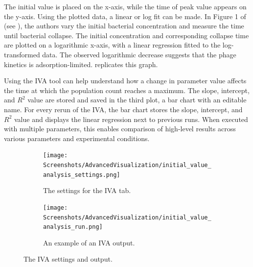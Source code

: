 The initial value is placed on the x-axis, while the time of peak value appears on the y-axis. 
Using the plotted data, a linear or log fit can be made.
In Figure 1 of \citet{mullaExtremeDiversityPhage2024} (see ), the authors vary the initial bacterial concentration and measure the time until bacterial collapse. 
The initial concentration and corresponding collapse time are plotted on a logarithmic x-axis, with a linear regression fitted to the log-transformed data.
The observed logarithmic decrease suggests that the phage kinetics is adsorption-limited. 
 replicates this graph. 

Using the IVA tool can help understand how a change in parameter value affects the time at which the population count reaches a maximum.
The slope, intercept, and $R^2$ value are stored and saved in the third plot, a bar chart with an editable name. 
For every rerun of the IVA, the bar chart stores the slope, intercept, and $R^2$ value and displays the linear regression next to previous runs. 
When executed with multiple parameters, this enables comparison of high-level results across various parameters and experimental conditions.

\begin{figure}[h!]
    \centering
    \begin{subfigure}{0.49\linewidth}
        \centering
        \captionsetup{width=1\linewidth}
        \texttt{[image: Screenshots/AdvancedVisualization/initial\_value\_analysis\_settings.png]}
        \caption{
            The settings for the IVA tab. 
        }
        \label{fig:ss:av:initial_value_analysis_settings}
        \vspace*{\fill}
    \end{subfigure}
    \hfill
    \begin{subfigure}{0.49\linewidth}
        \centering
        \captionsetup{width=1\linewidth}
        \texttt{[image: Screenshots/AdvancedVisualization/initial\_value\_analysis\_run.png]}
        \caption{
            An example of an IVA output. 
        }
        \label{fig:ss:av:initial_value_analysis_run}
        \vspace*{\fill}
    \end{subfigure}
    \caption{The IVA settings and output. }
\end{figure}

